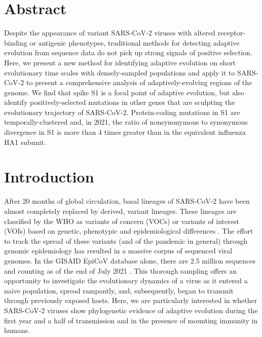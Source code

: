 \documentclass[12pt, letterpaper]{article}
\begin{document}
\singlespacing

\bigskip

\bigskip

\bigskip
\normalsize


\section*{Abstract}
Despite the appearance of variant SARS-CoV-2 viruses with altered receptor-binding or antigenic phenotypes, traditional methods for detecting adaptive evolution from sequence data do not pick up strong signals of positive selection. Here, we present a new method for identifying adaptive evolution on short evolutionary time scales with densely-sampled populations and apply it to SARS-CoV-2 to present a comprehensive analysis of adaptively-evolving regions of the genome. We find that spike S1 is a focal point of adaptive evolution, but also identify positively-selected mutations in other genes that are sculpting the evolutionary trajectory of SARS-CoV-2. Protein-coding mutations in S1 are temporally-clustered and, in 2021, the ratio of nonsynonymous to synonymous divergence in S1 is more than 4 times greater than in the equivalent influenza HA1 subunit.


\section*{Introduction}
\onehalfspacing
After 20 months of global circulation, basal lineages of SARS-CoV-2 have been almost completely replaced by derived, variant lineages. These lineages are classified by the WHO as variants of concern (VOCs) or variants of interest (VOIs) based on genetic, phenotypic and epidemiological differences \citep{Konings2021-vm}. The effort to track the spread of these variants (and of the pandemic in general) through genomic epidemiology has resulted in a massive corpus of sequenced viral genomes. In the GISAID EpiCoV database alone, there are 2.5 million sequences and counting as of the end of July 2021 \citep{Shu2017-ql}. This thorough sampling offers an opportunity to investigate the evolutionary dynamics of a virus as it entered a naive population, spread rampantly, and, subsequently, began to transmit through previously exposed hosts. Here, we are particularly interested in whether SARS-CoV-2 viruses show phylogenetic evidence of adaptive evolution during the first year and a half of transmission and in the presence of mounting immunity in humans.
\end{document}
